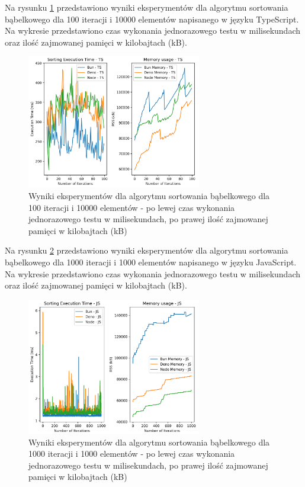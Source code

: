 Na rysunku \ref{fig:bubble_sorting_e2_ts} przedstawiono wyniki eksperymentów dla algorytmu sortowania bąbelkowego dla 100 iteracji i 10000 elementów napisanego w języku TypeScript. Na wykresie przedstawiono czas wykonania jednorazowego testu w milisekundach oraz ilość zajmowanej pamięci w kilobajtach (kB).

\begin{figure}[H]
  \centering
  \includegraphics[width=0.68\textwidth]{Figures/sorting/sorting_bubble_100_10000_ts.png}
  \caption{Wyniki eksperymentów dla algorytmu sortowania bąbelkowego dla 100 iteracji i 10000 elementów - po lewej czas wykonania jednorazowego testu w milisekundach, po prawej ilość zajmowanej pamięci w kilobajtach (kB)}
  \label{fig:bubble_sorting_e2_ts}
\end{figure}

Na rysunku \ref{fig:bubble_sorting_e3} przedstawiono wyniki eksperymentów dla algorytmu sortowania bąbelkowego dla 1000 iteracji i 1000 elementów napisanego w języku JavaScript. Na wykresie przedstawiono czas wykonania jednorazowego testu w milisekundach oraz ilość zajmowanej pamięci w kilobajtach (kB).

\begin{figure}[H]
  \centering
  \includegraphics[width=0.68\textwidth]{Figures/sorting/sorting_bubble_1000_1000_js.png}
  \caption{Wyniki eksperymentów dla algorytmu sortowania bąbelkowego dla 1000 iteracji i 1000 elementów - po lewej czas wykonania jednorazowego testu w milisekundach, po prawej ilość zajmowanej pamięci w kilobajtach (kB)}
  \label{fig:bubble_sorting_e3}
\end{figure}

